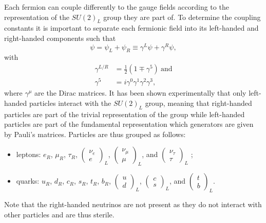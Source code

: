     Each fermion can couple differently to the gauge fields according to the representation of the $ SU(2)_L $ group they are part of. To determine the coupling constants it is important to separate each fermionic field into its left-handed and right-handed components such that
    \begin{equation}
      \psi = \psi_L + \psi_R \equiv \gamma^L \psi + \gamma^R \psi ,
    \end{equation}
    with
    \begin{align}
      \gamma^{L/R} & = \frac{1}{2} \left( 1 \mp \gamma^5 \right) \ \text{and} \\
      \gamma^5 & = i \gamma^0 \gamma^1 \gamma^2 \gamma^3 ,
    \end{align}
    where $ \gamma^\mu $ are the Dirac matrices. It has been shown experimentally that only left-handed particles interact with the $ SU(2)_L $ group, meaning that right-handed particles are part of the trivial representation of the group while left-handed particles are part of the fundamental representation which generators are given by Pauli's matrices. Particles are thus grouped as follows:
    \begin{itemize}
      \item leptons: $ e_R $, $ \mu_R $, $ \tau_R $, $ \left( \begin{matrix} \nu_e \\ e \end{matrix} \right)_L $, $ \left( \begin{matrix} \nu_\mu \\ \mu \end{matrix} \right)_L $, and $ \left( \begin{matrix} \nu_\tau \\ \tau \end{matrix} \right)_L $ ;
      \item quarks: $ u_R $, $ d_R $, $ c_R $, $ s_R $, $ t_R $, $ b_R $, $ \left( \begin{matrix} u \\ d \end{matrix} \right)_L $, $ \left( \begin{matrix} c \\ s \end{matrix} \right)_L $, and $ \left( \begin{matrix} t \\ b \end{matrix} \right)_L $.
    \end{itemize}
    Note that the right-handed neutrinos are not present as they do not interact with other particles and are thus sterile. \\

